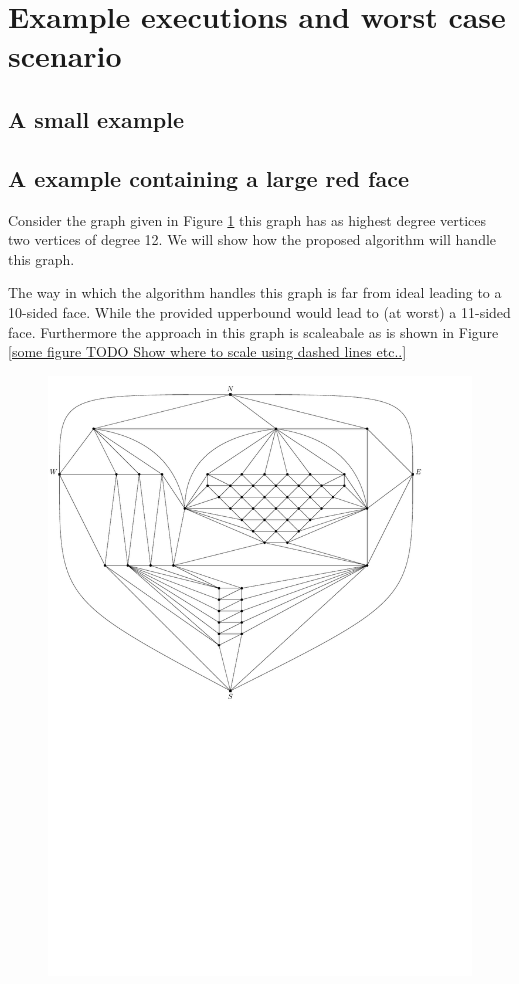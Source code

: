 
\section{Example executions and worst case scenario}

\subsection{A small example}


\subsection{A example containing a large red face}

Consider the graph given in Figure \ref{fig:ex:vert:graph} this graph has as highest degree vertices two vertices of degree 12. We will show how the proposed algorithm will handle this graph.

The way in which the algorithm handles this graph is far from ideal leading to a 10-sided face. While the provided upperbound would lead to (at worst) a 11-sided  face. Furthermore the approach in this graph is scaleabale as is shown in Figure \ref{some figure TODO Show where to scale using dashed lines etc..}

\begin{figure}[h]
  \centering
  \includegraphics[width=\textwidth]{examples/img/vertWorstCase/graph}
  \caption{}
  \label{fig:ex:vert:graph}
\end{figure}

